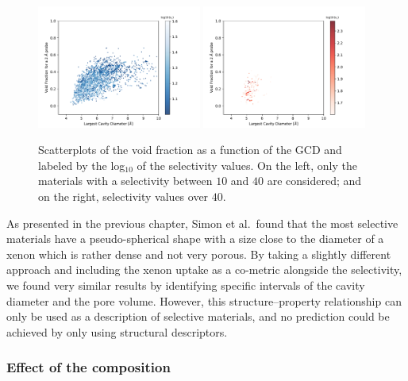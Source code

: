 \documentclass[main.tex]{subfiles}
\begin{document}
\begin{figure}[h!]
  \centering
  \includegraphics[width=0.48\textwidth]{figures/2-thermo/Scatterplot_vf_gcd_selectivity.pdf}
  \includegraphics[width=0.48\textwidth]{figures/2-thermo/Scatterplot_vf_gcd_selectivity_zoom.pdf}  
  \caption{Scatterplots of the void fraction as a function of the GCD and labeled by the log$_10$ of the selectivity values. On the left, only the materials with a selectivity between $10$ and $40$ are considered; and on the right, selectivity values over $40$.}\label{fgr:gcd_vf}
\end{figure}


As presented in the previous chapter, Simon et al.\ found that the most selective materials have a pseudo-spherical shape with a size close to the diameter of a xenon which is rather dense and not very porous. By taking a slightly different approach and including the xenon uptake as a co-metric alongside the selectivity, we found very similar results by identifying specific intervals of the cavity diameter and the pore volume. However, this structure--property relationship can only be used as a description of selective materials, and no prediction could be achieved by only using structural descriptors. 

\subsubsection{Effect of the composition}
\end{document}
